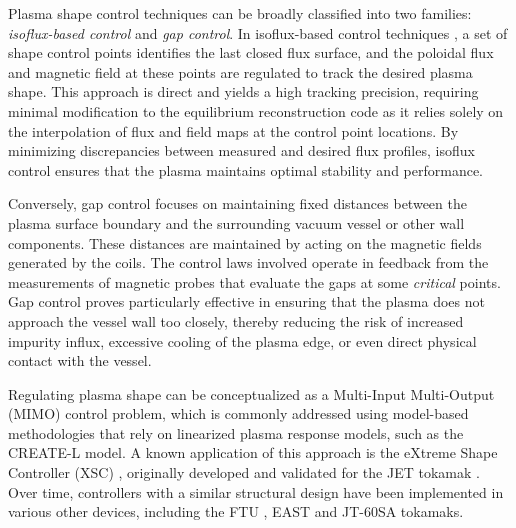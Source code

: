 Plasma shape control techniques can be broadly classified into two families: \emph{isoflux-based control} and \emph{gap control}. In isoflux-based control techniques \cite{ambrosino_model-based_2020}, a set of shape control points identifies the last closed flux surface, and the poloidal flux and magnetic field at these points are regulated to track the desired plasma shape. This approach is direct and yields a high tracking precision, requiring minimal modification to the equilibrium reconstruction code as it relies solely on the interpolation of flux and field maps at the control point locations. By minimizing discrepancies between measured and desired flux profiles, isoflux control ensures that the plasma maintains optimal stability and performance.

Conversely, gap control \cite{wang_first_2019} focuses on maintaining fixed distances between the plasma surface boundary and the surrounding vacuum vessel or other wall components. These distances are maintained by acting on the magnetic fields generated by the coils. The control laws involved operate in feedback from the measurements of magnetic probes that evaluate the gaps at some \emph{critical} points. Gap control proves particularly effective in ensuring that the plasma does not approach the vessel wall too closely, thereby reducing the risk of increased impurity influx, excessive cooling of the plasma edge, or even direct physical contact with the vessel.

Regulating plasma shape can be conceptualized as a Multi-Input Multi-Output (MIMO) control problem, which is commonly addressed using model-based methodologies that rely on linearized plasma response models, such as the CREATE-L \cite{villone_comparison_1997,albanese_linearized_1998} model. A known application of this approach is the eXtreme Shape Controller (XSC) \cite{albanese_design_2005}, originally developed and validated for the JET tokamak \cite{albanese_plasma_2003-1}. Over time, controllers with a similar structural design have been implemented in various other devices, including the FTU \cite{albanese_plasma_2003}, EAST \cite{ambrosino_model-based_2020} and JT-60SA \cite{cruz_control-oriented_2017} tokamaks.
